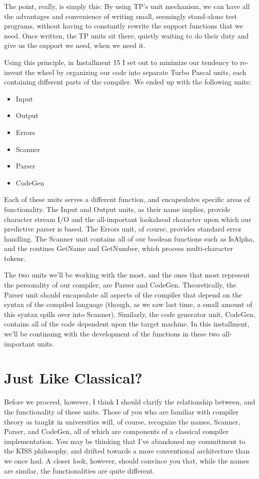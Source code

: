 The point, really, is simply this:  By using TP's unit mechanism, we can have all the advantages and convenience of writing small, seemingly stand-alone test programs, without having to constantly rewrite the support functions that we need. Once written, the TP units sit there, quietly waiting to do their duty and give us the support we need, when we need it.

Using this principle, in Installment 15 I set out to minimize our tendency to re-invent the wheel by organizing  our code into separate Turbo Pascal units, each containing different parts of the compiler. We ended up with the following units:

\begin{itemize}
\item	Input
\item	Output
\item	Errors
\item	Scanner
\item	Parser
\item	CodeGen
\end{itemize}

Each of these units serves a different function, and encapsulates specific areas of functionality. The Input and Output units, as their name implies, provide character stream I/O and the all-important lookahead character upon which our predictive parser is based. The Errors unit, of course, provides standard error handling. The Scanner unit contains all of our boolean functions such as IsAlpha, and the routines GetName and GetNumber, which process multi-character tokens.

The two units we'll be working with the most, and the ones that most represent the personality of our compiler, are Parser and CodeGen. Theoretically, the Parser unit should encapsulate all aspects of the compiler that depend on the syntax of the compiled language (though, as we saw last time, a small amount of this syntax spills over into Scanner). Similarly, the code generator unit, CodeGen, contains all of the code dependent upon the target machine. In this installment, we'll be continuing with the development of the functions in these two all- important units.

\section{Just Like Classical?}

Before we proceed, however, I think I should clarify the relationship between, and the functionality of these units. Those of you who are familiar with compiler theory as taught in universities will, of course, recognize the names, Scanner, Parser, and CodeGen, all of which are components of a classical compiler implementation. You may be thinking that I've abandoned my commitment to the KISS philosophy, and drifted towards a more conventional architecture than we once had. A closer look, however, should convince you that, while the names are similar, the functionalities are quite different.

